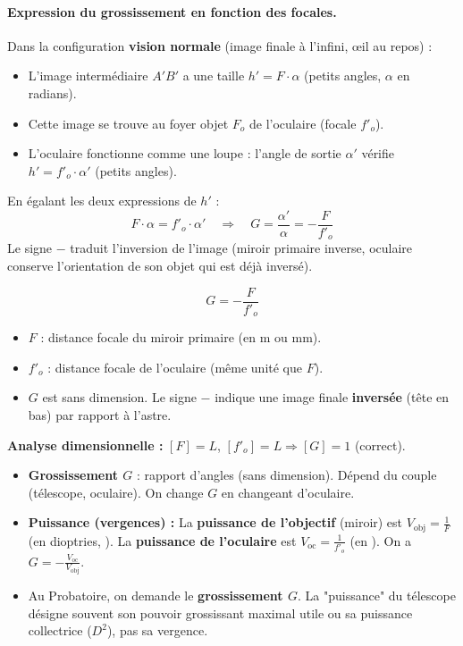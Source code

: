 \documentclass[11pt]{article}
\begin{document}
\paragraph{Expression du grossissement en fonction des focales.}
Dans la configuration \textbf{vision normale} (image finale à l'infini, œil au repos) :
\begin{itemize}
    \item L'image intermédiaire $A'B'$ a une taille $h' = F \cdot \alpha$ (petits angles, $\alpha$ en radians).
    \item Cette image se trouve au foyer objet $F_o$ de l'oculaire (focale $f'_o$).
    \item L'oculaire fonctionne comme une loupe : l'angle de sortie $\alpha'$ vérifie $h' = f'_o \cdot \alpha'$ (petits angles).
\end{itemize}
En égalant les deux expressions de $h'$ :
\[
F \cdot \alpha = f'_o \cdot \alpha' \quad \Rightarrow \quad G = \frac{\alpha'}{\alpha} = -\frac{F}{f'_o}
\]
Le signe $-$ traduit l'inversion de l'image (miroir primaire inverse, oculaire conserve l'orientation de son objet qui est déjà inversé).

\begin{propriete}
\[
\boxed{G = -\frac{F}{f'_o}}
\]
\begin{itemize}
    \item $F$ : distance focale du miroir primaire (en \si{\meter} ou \si{\milli\meter}).
    \item $f'_o$ : distance focale de l'oculaire (même unité que $F$).
    \item $G$ est sans dimension. Le signe $-$ indique une image finale \textbf{inversée} (tête en bas) par rapport à l'astre.
\end{itemize}
\textbf{Analyse dimensionnelle :} $[F] = L$, $[f'_o] = L \Rightarrow [G] = 1$ (correct).
\end{propriete}

\begin{attention}
\begin{itemize}
    \item \textbf{Grossissement $G$} : rapport d'angles (sans dimension). Dépend du couple (télescope, oculaire). On change $G$ en changeant d'oculaire.
    \item \textbf{Puissance (vergences) :} La \textbf{puissance de l'objectif} (miroir) est $V_{\text{obj}} = \frac{1}{F}$ (en dioptries, \si{\dioptre}). La \textbf{puissance de l'oculaire} est $V_{\text{oc}} = \frac{1}{f'_o}$ (en \si{\dioptre}). On a $G = -\frac{V_{\text{oc}}}{V_{\text{obj}}}$.
    \item Au Probatoire, on demande le \textbf{grossissement $G$}. La "puissance" du télescope désigne souvent son pouvoir grossissant maximal utile ou sa puissance collectrice ($D^2$), pas sa vergence.
\end{itemize}
\end{attention}
\end{document}
